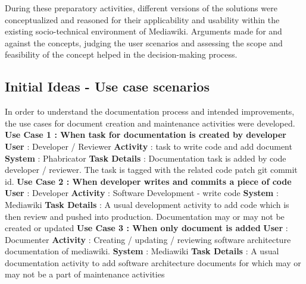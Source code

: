 During these preparatory activities, different versions of the solutions were conceptualized and reasoned for their applicability and usability within the existing socio-technical environment of Mediawiki.
Arguments made for and against the concepts, judging the user scenarios and assessing the scope and feasibility of the concept helped in the decision-making process.


\subsection{Initial Ideas - Use case scenarios }
In order to understand the documentation process and intended improvements, the use cases for document creation and maintenance activities were developed.
\newline \newline
\indent \textbf{Use Case 1 : When task for documentation is created by developer}
\newline \textbf{User} : Developer / Reviewer
\newline \textbf{Activity} : task to write code and add document
\newline \textbf{System} : Phabricator
\newline \textbf{Task Details} : Documentation task is added by code developer / reviewer. The task is tagged with the related code patch git commit id.
\newline \newline
\indent \textbf{Use Case 2 : When developer writes and commits a piece of code}
\newline \textbf{User} : Developer
\newline \textbf{Activity} : Software Development - write code
\newline \textbf{System} : Mediawiki
\newline \textbf{Task Details} : A usual development activity to add code which is then review and pushed into production. Documentation may or may not be created or updated
\newline \newline
\indent \textbf{Use Case 3 : When only document is added}
\newline \textbf{User} : Documenter
\newline \textbf{Activity} : Creating / updating / reviewing software architecture documentation of mediawiki.
\newline \textbf{System} : Mediawiki
\newline \textbf{Task Details} : A usual documentation activity to add software architecture documents for which may or may not be a part of maintenance activities
